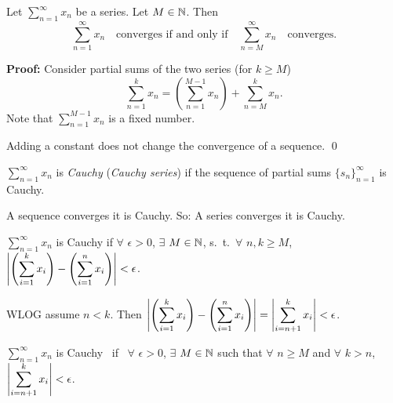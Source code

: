 \documentclass[10pt,aspectratio=169]{beamer}
\begin{document}
\begin{frame}

\begin{proposition}
Let $\displaystyle\sum_{n=1}^\infty x_n$ be a series.  Let $M \in {\mathbb{N}}$.  Then
\begin{equation*}
\sum_{n=1}^\infty x_n \quad \text{converges if and only if} \quad
\sum_{n=M}^\infty x_n \quad \text{converges.}
\end{equation*}
\end{proposition}

\pause
\textbf{Proof:}
Consider partial sums of the two series (for $k \geq M$)
\begin{equation*}
\sum_{n=1}^{k} x_n
=
\left(
\sum_{n=1}^{M-1} x_n
\right)
+
\sum_{n=M}^{k} x_n .
\end{equation*}
\pause
Note that 
$\sum_{n=1}^{M-1} x_n$ is a fixed number.

\pause
\medskip

Adding a constant does not change the convergence of a sequence.
\qed

\end{frame}

\begin{frame}

\begin{definition}
$\displaystyle\sum_{n=1}^\infty x_n$ is \emph{Cauchy} (\emph{Cauchy series})
if the sequence of partial sums $\{ s_n \}_{n=1}^\infty$ is Cauchy.
\end{definition}

\pause
A sequence converges \wiffif it is Cauchy.
\pause \quad So:
A series converges \wiffif it is Cauchy.

\pause
\medskip

$\displaystyle\sum_{n=1}^\infty x_n$ is Cauchy if $\forall$ $\epsilon > 0$, $\exists$
$M \in {\mathbb{N}}$, s.\ t.\ $\forall$ $n,k \geq M$, ~
$\displaystyle
\left\lvert { \left( \sum_{i=1}^k x_i \right) - \left( \sum_{i=1}^n x_i \right) } \right\rvert
< \epsilon$.

\pause
\medskip

WLOG assume $n < k$.  Then
\quad
$\displaystyle
\left\lvert { \left( \sum_{i=1}^k x_i \right) - \left( \sum_{i=1}^n x_i \right) } \right\rvert
=
\left\lvert { \sum_{i={n+1}}^k x_i } \right\rvert
< \epsilon$.
\pause
\quad
\thus

\begin{proposition}
$\displaystyle\sum_{n=1}^\infty x_n$ is Cauchy ~if~ $\forall$ $\epsilon > 0$, 
$\exists$ $M \in {\mathbb{N}}$ such that $\forall$ $n \geq M$
and $\forall$ $k > n$, 
\quad
$\displaystyle \left\lvert { \sum_{i={n+1}}^k x_i } \right\rvert < \epsilon$.
\end{proposition}

\end{frame}
\end{document}

